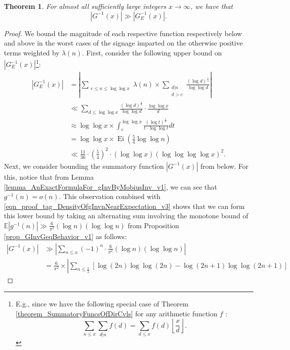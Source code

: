 \documentclass[11pt,reqno,a4letter]{article}
\numberwithin{figure}{section}
\numberwithin{table}{section}
\newcommand{\cf}{\textit{cf.\ }}
\newcommand{\Floor}[2]{\ensuremath{\left\lfloor \frac{#1}{#2} \right\rfloor}}
\theoremstyle{plain}
\newtheorem{theorem}{Theorem}
\numberwithin{theorem}{section}
\theoremstyle{definition}
\begin{document}
\begin{theorem} 
\label{theorem_GInvxLowerBoundByGEInvx_v1} 
For almost all sufficiently large integers $x \rightarrow \infty$, we have that 
\[
|G^{-1}(x)| \gg |G_E^{-1}(x)|. 
\]
\end{theorem} 
\begin{proof} 
We bound the magnitude of each respective function respectively below and above in the worst 
cases of the signage imparted on the otherwise positive terms weighted by $\lambda(n)$. 
First, consider the following upper bound on $|G_E^{-1}(x)|$\footnote{ 
     E.g., since we have the following special case of 
     Theorem \ref{theorem_SummatoryFuncsOfDirCvls} 
     for any arithmetic function $f$ \cite[\cf \S 3.10]{APOSTOLANUMT}: 
     \[
     \sum_{n \leq x} \sum_{d|n} f(d) = \sum_{d \leq x} f(d) \Floor{x}{d}. 
     \]
}: 
\begin{align*} 
|G_E^{-1}(x)| & = \left\lvert \sum_{\substack{e \leq n \leq \log\log x}} \lambda(n) \times 
     \sum_{\substack{d|n \\ d > e}} \frac{(\log d)^{\frac{1}{4}}}{\log\log d} 
     \right\rvert \\ 
     & \ll \sum_{d \leq \log\log x} \frac{(\log d)^{\frac{1}{4}}}{\log\log d} \cdot 
     \frac{\log\log x}{d} \\ 
     & \approx \log\log x \times \int_{e}^{\log\log x} \frac{(\log t)^{\frac{1}{4}}}{t \cdot \log\log t} dt \\ 
     & = \log\log x \times \operatorname{Ei}\left(\frac{5}{4} \log\log n\right) \\ 
     & \ll \frac{11}{36} \cdot \left(\frac{5}{4}\right)^2 \cdot (\log\log x) (\log\log\log\log x)^2. 
\end{align*} 
Next, we consider bounding the summatory function $|G^{-1}(x)|$ from below. For this, notice that 
from Lemma \ref{lemma_AnExactFormulaFor_gInvByMobiusInv_v1}, we can see that $g^{-1}(n) = o(n)$. 
This observation combined with \eqref{eqn_proof_tag_DensityOfgInvnNearExpectation_v3} shows that 
we can form this lower bound by taking an alternating sum involving the monotone bound of 
$\mathbb{E}|g^{-1}(n)| \gg \frac{6}{\pi^2} (\log n) (\log\log n)$ from 
Proposition \ref{prop_GInvGeqBehavior_v1} as follows: 
\begin{align*} 
|G^{-1}(x)| & \gg \left\lvert \sum_{n \leq x} (-1)^n \cdot \frac{6}{\pi^2} (\log n) (\log\log n) \right\rvert \\ 
     & = \frac{6}{\pi^2} \times \left\lvert \sum_{n \leq \frac{x}{2}} \left[ 
     \log(2n) \log\log(2n) - \log(2n+1) \log\log(2n+1)\right] 

\end{align*}
\end{proof}
\end{document}
